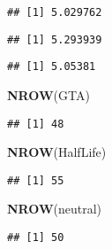 \documentclass[
]{article}
\newenvironment{Shaded}{\begin{snugshade}}{\end{snugshade}}
\newcommand{\FunctionTok}[1]{\textcolor[rgb]{0.13,0.29,0.53}{\textbf{#1}}}
\newcommand{\NormalTok}[1]{#1}
\newcommand{\SpecialCharTok}[1]{\textcolor[rgb]{0.81,0.36,0.00}{\textbf{#1}}}
\begin{document}
\begin{verbatim}
## [1] 5.029762
\end{verbatim}

\begin{Shaded}
\end{Shaded}

\begin{verbatim}
## [1] 5.293939
\end{verbatim}

\begin{Shaded}
\end{Shaded}

\begin{verbatim}
## [1] 5.05381
\end{verbatim}

\begin{Shaded}
\begin{Highlighting}[]
\FunctionTok{NROW}\NormalTok{(GTA)}
\end{Highlighting}
\end{Shaded}

\begin{verbatim}
## [1] 48
\end{verbatim}

\begin{Shaded}
\begin{Highlighting}[]
\FunctionTok{NROW}\NormalTok{(HalfLife)}
\end{Highlighting}
\end{Shaded}

\begin{verbatim}
## [1] 55
\end{verbatim}

\begin{Shaded}
\begin{Highlighting}[]
\FunctionTok{NROW}\NormalTok{(neutral)}
\end{Highlighting}
\end{Shaded}

\begin{verbatim}
## [1] 50
\end{verbatim}
\end{document}
